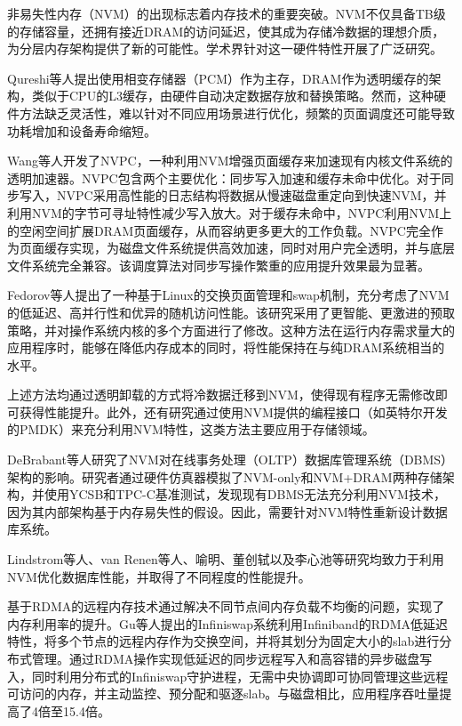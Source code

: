 非易失性内存（NVM）的出现标志着内存技术的重要突破。NVM不仅具备TB级的存储容量，还拥有接近DRAM的访问延迟，使其成为存储冷数据的理想介质，为分层内存架构提供了新的可能性。学术界针对这一硬件特性开展了广泛研究。

Qureshi等人提出使用相变存储器（PCM）作为主存，DRAM作为透明缓存的架构，类似于CPU的L3缓存，由硬件自动决定数据存放和替换策略。然而，这种硬件方法缺乏灵活性，难以针对不同应用场景进行优化，频繁的页面调度还可能导致功耗增加和设备寿命缩短。

Wang等人开发了NVPC，一种利用NVM增强页面缓存来加速现有内核文件系统的透明加速器。NVPC包含两个主要优化：同步写入加速和缓存未命中优化。对于同步写入，NVPC采用高性能的日志结构将数据从慢速磁盘重定向到快速NVM，并利用NVM的字节可寻址特性减少写入放大。对于缓存未命中，NVPC利用NVM上的空闲空间扩展DRAM页面缓存，从而容纳更多更大的工作负载。NVPC完全作为页面缓存实现，为磁盘文件系统提供高效加速，同时对用户完全透明，并与底层文件系统完全兼容。该调度算法对同步写操作繁重的应用提升效果最为显著。

Fedorov等人提出了一种基于Linux的交换页面管理和swap机制，充分考虑了NVM的低延迟、高并行性和优异的随机访问性能。该研究采用了更智能、更激进的预取策略，并对操作系统内核的多个方面进行了修改。这种方法在运行内存需求量大的应用程序时，能够在降低内存成本的同时，将性能保持在与纯DRAM系统相当的水平。

上述方法均通过透明卸载的方式将冷数据迁移到NVM，使得现有程序无需修改即可获得性能提升。此外，还有研究通过使用NVM提供的编程接口（如英特尔开发的PMDK）来充分利用NVM特性，这类方法主要应用于存储领域。

DeBrabant等人研究了NVM对在线事务处理（OLTP）数据库管理系统（DBMS）架构的影响。研究者通过硬件仿真器模拟了NVM-only和NVM+DRAM两种存储架构，并使用YCSB和TPC-C基准测试，发现现有DBMS无法充分利用NVM技术，因为其内部架构基于内存易失性的假设。因此，需要针对NVM特性重新设计数据库系统。

Lindstrom等人、van Renen等人、喻明、董创轼以及李心池等研究均致力于利用NVM优化数据库性能，并取得了不同程度的性能提升。

基于RDMA的远程内存技术通过解决不同节点间内存负载不均衡的问题，实现了内存利用率的提升。Gu等人提出的Infiniswap系统利用Infiniband的RDMA低延迟特性，将多个节点的远程内存作为交换空间，并将其划分为固定大小的slab进行分布式管理。通过RDMA操作实现低延迟的同步远程写入和高容错的异步磁盘写入，同时利用分布式的Infiniswap守护进程，无需中央协调即可协同管理这些远程可访问的内存，并主动监控、预分配和驱逐slab。与磁盘相比，应用程序吞吐量提高了4倍至15.4倍。


